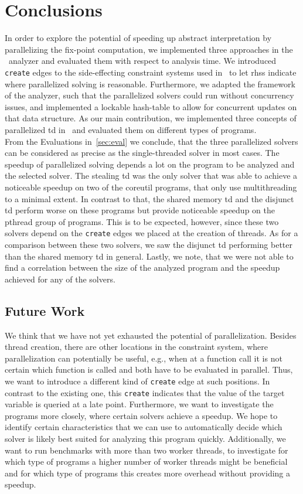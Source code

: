 \section{Conclusions}
\label{sec:conclusions}
In order to explore the potential of speeding up abstract interpretation by parallelizing the fix-point computation, we implemented three approaches in the \gob\ analyzer and evaluated them with respect to analysis time.
We introduced \texttt{create} edges to the side-effecting constraint systems used in \gob\ to let \acp{rhs} indicate where parallelized solving is reasonable. Furthermore, we adapted the framework of the analyzer, such that the parallelized solvers could run without concurrency issues, and implemented a lockable hash-table to allow for concurrent updates on that data structure. As our main contribution, we implemented three concepts of parallelized \acl{td} in \gob\ and evaluated them on different types of programs.\\
From the Evaluations in~\autoref{sec:eval} we conclude, that the three parallelized solvers can be considered as precise as the single-threaded solver in most cases. The speedup of parallelized solving depends a lot on the program to be analyzed and the selected solver. The stealing \ac{td} was the only solver that was able to achieve a noticeable speedup on two of the coreutil programs, that only use multithreading to a minimal extent. In contrast to that, the shared memory \ac{td} and the disjunct \ac{td} perform worse on these programs but provide noticeable speedup on the pthread group of programs. This is to be expected, however, since these two solvers depend on the \texttt{create} edges we placed at the creation of threads. As for a comparison between these two solvers, we saw the disjunct \ac{td} performing better than the shared memory \ac{td} in general. Lastly, we note, that we were not able to find a correlation between the size of the analyzed program and the speedup achieved for any of the solvers.

  \label{sec:conclusions:futureWork} 
  \subsection{Future Work}
  We think that we have not yet exhausted the potential of parallelization. Besides thread creation, there are other locations in the constraint system, where parallelization can potentially be useful, e.g., when at a function call it is not certain which function is called and both have to be evaluated in parallel. Thus, we want to introduce a different kind of \texttt{create} edge at such positions. In contrast to the existing one, this \texttt{create} indicates that the value of the target variable is queried at a late point.
  Furthermore, we want to investigate the programs more closely, where certain solvers achieve a speedup. We hope to identify certain characteristics that we can use to automatically decide which solver is likely best suited for analyzing this program quickly. Additionally, we want to run benchmarks with more than two worker threads, to investigate for which type of programs a higher number of worker threads might be beneficial and for which type of programs this creates more overhead without providing a speedup.